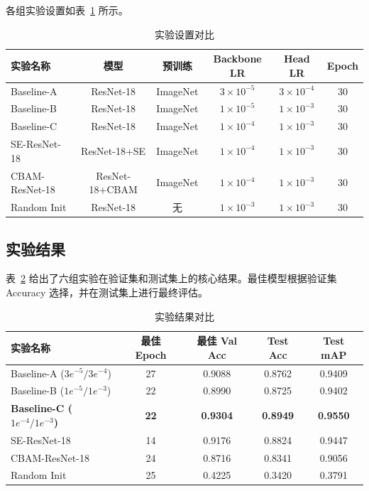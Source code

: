 \documentclass{article}
\begin{document}
各组实验设置如表~\ref{tab:task1_config} 所示。

\begin{table}[H]
\centering
\caption{实验设置对比}
\label{tab:task1_config}
\begin{tabular}{lccccc}
\toprule
实验名称 & 模型 & 预训练 & Backbone LR & Head LR & Epoch \\
\midrule
Baseline-A & ResNet-18 & ImageNet & $3\times10^{-5}$ & $3\times10^{-4}$ & 30 \\
Baseline-B & ResNet-18 & ImageNet & $1\times10^{-5}$ & $1\times10^{-3}$ & 30 \\
Baseline-C & ResNet-18 & ImageNet & $1\times10^{-4}$ & $1\times10^{-3}$ & 30 \\
SE-ResNet-18 & ResNet-18+SE & ImageNet & $1\times10^{-4}$ & $1\times10^{-3}$ & 30 \\
CBAM-ResNet-18 & ResNet-18+CBAM & ImageNet & $1\times10^{-4}$ & $1\times10^{-3}$ & 30 \\
Random Init & ResNet-18 & 无 & $1\times10^{-3}$ & $1\times10^{-3}$ & 30 \\
\bottomrule
\end{tabular}
\end{table}

\subsection{实验结果}
表~\ref{tab:task1_result} 给出了六组实验在验证集和测试集上的核心结果。最佳模型根据验证集 Accuracy 选择，并在测试集上进行最终评估。

\begin{table}[H]
\centering
\caption{实验结果对比}
\label{tab:task1_result}
\begin{tabular}{lcccc}
\toprule
实验名称 & 最佳 Epoch & 最佳 Val Acc & Test Acc & Test mAP \\
\midrule
Baseline-A ($3e^{-5}/3e^{-4}$) & 27 & 0.9088 & 0.8762 & 0.9409 \\
Baseline-B ($1e^{-5}/1e^{-3}$) & 22 & 0.8990 & 0.8725 & 0.9402 \\
\textbf{Baseline-C ($1e^{-4}/1e^{-3}$)} & \textbf{22} & \textbf{0.9304} & \textbf{0.8949} & \textbf{0.9550} \\
SE-ResNet-18 & 14 & 0.9176 & 0.8824 & 0.9447 \\
CBAM-ResNet-18 & 24 & 0.8716 & 0.8341 & 0.9056 \\
Random Init & 25 & 0.4225 & 0.3420 & 0.3791 \\
\bottomrule
\end{tabular}
\end{table}
\end{document}
